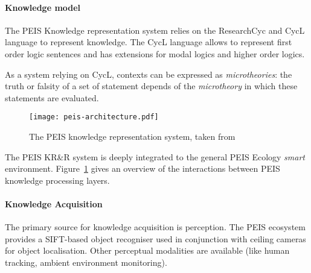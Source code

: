 \documentclass[journal]{IEEEtran}
\begin{document}

\paragraph{Knowledge model} The PEIS Knowledge representation system relies on
the {\sc ResearchCyc} and {\sc CycL} language to represent knowledge. The {\sc CycL} language
allows to represent first order logic sentences and has extensions for modal logics and higher order logics.


As a system relying on {\sc CycL}, contexts can be expressed as
\emph{microtheories}: the truth or falsity of a set of statement depends of the
\emph{microtheory} in which these statements are evaluated.


\begin{figure}
	\centering
	\texttt{[image: peis-architecture.pdf]}
	\caption{The PEIS knowledge representation system, taken from~\cite{Daoutis2009}}
	\label{fig|peis-archi}
\end{figure}

The PEIS KR\&R system is deeply integrated to the general PEIS Ecology
\emph{smart} environment. Figure~\ref{fig|peis-archi} gives an overview of the
interactions between PEIS knowledge processing layers.

\paragraph{Knowledge Acquisition} The primary source for knowledge acquisition
is perception.  The PEIS ecosystem provides a SIFT-based object recogniser used
in conjunction with ceiling cameras for object localisation.  Other perceptual
modalities are available (like human tracking, ambient environment monitoring).
\end{document}
